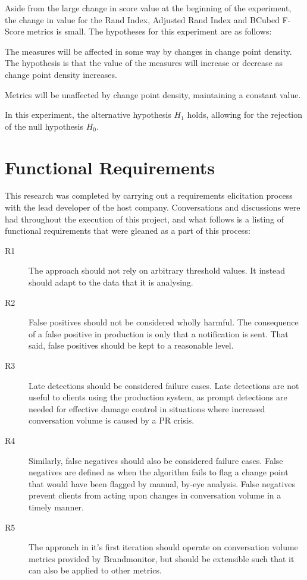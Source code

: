 \documentclass[../main.tex]{subfiles}
\begin{document}
Aside from the large change in score value at the beginning of the experiment, the change in value for the Rand Index, Adjusted Rand Index and BCubed F-Score metrics is small. The hypotheses for this experiment are as follows:

\begin{hypothesis*}
    The measures will be affected in some way by changes in change point density. The hypothesis is that the value of the measures will increase or decrease as change point density increases.
\end{hypothesis*}

\begin{nullhypothesis*}
    Metrics will be unaffected by change point density, maintaining a constant value.
\end{nullhypothesis*}

In this experiment, the alternative hypothesis $H_1$ holds, allowing for the rejection of the null hypothesis $H_0$.

\section{Functional Requirements}

This research was completed by carrying out a requirements elicitation process with the lead developer of the host company. Conversations and discussions were had throughout the execution of this project, and what follows is a listing of functional requirements that were gleaned as a part of this process:

\begin{description}
    \item[R1] The approach should not rely on arbitrary threshold values. It instead should adapt to the data that it is analysing.
    \item[R2] False positives should not be considered wholly harmful. The consequence of a false positive in production is only that a notification is sent. That said, false positives should be kept to a reasonable level.
    \item[R3] Late detections should be considered failure cases. Late detections are not useful to clients using the production system, as prompt detections are needed for effective damage control in situations where increased conversation volume is caused by a PR crisis.
    \item[R4] Similarly, false negatives should also be considered failure cases. False negatives are defined as when the algorithm fails to flag a change point that would have been flagged by manual, by-eye analysis. False negatives prevent clients from acting upon changes in conversation volume in a timely manner.
    \item[R5] The approach in it's first iteration should operate on conversation volume metrics provided by Brandmonitor, but should be extensible such that it can also be applied to other metrics.
\end{description}
\end{document}
